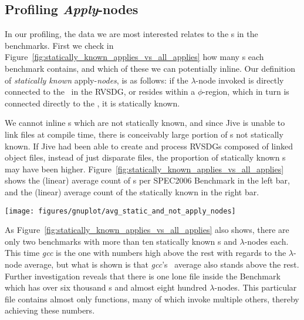 \subsection{Profiling \textit{Apply}-nodes}
\label{sub:res:ic_profiling}

In our profiling, the data we are most interested relates to the \applyNode s in
the benchmarks. First we check in
Figure~\ref{fig:statically_known_applies_vs_all_applies} how many \applyNode s
each benchmark contains, and which of these we can potentially inline. Our
definition of \textit{statically known} apply-\textit{nodes}, is as follows: if
the $\lambda$-node invoked is directly connected to the \applyNode~in the RVSDG,
or resides within a $\phi$-region, which in turn is connected directly to the
\applyNode , it is statically known.

We cannot inline \applyNode s which are not statically known, and since Jive is
unable to link files at compile time, there is conceivably large portion of
\applyNode s not statically known. If Jive had been able to create and process
RVSDGs composed of linked object files, instead of just disparate files, the
proportion of statically known \applyNode s may have been higher.
Figure~\ref{fig:statically_known_applies_vs_all_applies} shows the (linear)
average count of \applyNode s per SPEC2006 Benchmark in the left bar, and the
(linear) average count of the statically known in the right bar.

\begin{centering}
	\noindent\begin{minipage}{\textwidth}
		\captionsetup{type=figure}
		\hspace{-1em}
		\texttt{[image: figures/gnuplot/avg\_static\_and\_not\_apply\_nodes]}
	\end{minipage}
	\label{fig:statically_known_applies_vs_all_applies}
\end{centering}

As Figure~\ref{fig:statically_known_applies_vs_all_applies} also shows, there
are only two benchmarks with more than ten statically known \applyNode s and
$\lambda$-nodes each. This time \textit{gcc} is the one with numbers high above
the rest with regards to the $\lambda$-node average, but what is shown is that
\textit{gcc}'s \applyNode~average also stands above the rest. Further
investigation reveals that there is one lone file inside the Benchmark which has
over six thousand \applyNode s and almost eight hundred $\lambda$-nodes. This
particular file contains almost only functions, many of which invoke multiple
others, thereby achieving these numbers.

